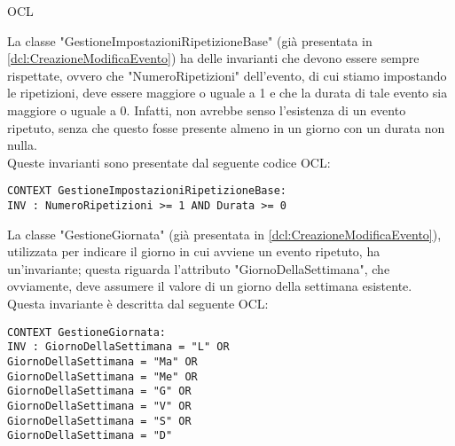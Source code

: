 \begin{listaPersonale}{OCL}
    \begin{center}
        
    \end{center}
    La classe "GestioneImpostazioniRipetizioneBase" (già presentata in
    \ref{dcl:CreazioneModificaEvento}) ha delle invarianti che devono essere sempre rispettate, ovvero che "NumeroRipetizioni" dell'evento, di cui stiamo impostando le ripetizioni, deve essere maggiore o uguale a 1 e che la durata di tale evento sia maggiore o uguale a 0. Infatti, non avrebbe senso l'esistenza di un evento ripetuto, senza che questo fosse presente almeno in un giorno con un durata non nulla.\\
    Queste invarianti sono presentate dal seguente codice OCL:

    \begin{lstlisting}
CONTEXT GestioneImpostazioniRipetizioneBase:
INV : NumeroRipetizioni >= 1 AND Durata >= 0
    \end{lstlisting}




    \begin{center}
        
    \end{center}
    La classe "GestioneGiornata" (già presentata in \ref{dcl:CreazioneModificaEvento}), utilizzata per indicare il giorno in cui avviene un evento ripetuto, ha un'invariante; questa riguarda l'attributo "GiornoDellaSettimana", che ovviamente, deve assumere il valore di un giorno della settimana esistente.\\
    Questa invariante è descritta dal seguente OCL:

    \begin{lstlisting}
CONTEXT GestioneGiornata:
INV : GiornoDellaSettimana = "L" OR
GiornoDellaSettimana = "Ma" OR
GiornoDellaSettimana = "Me" OR
GiornoDellaSettimana = "G" OR
GiornoDellaSettimana = "V" OR
GiornoDellaSettimana = "S" OR
GiornoDellaSettimana = "D"
    \end{lstlisting}





\end{listaPersonale}
